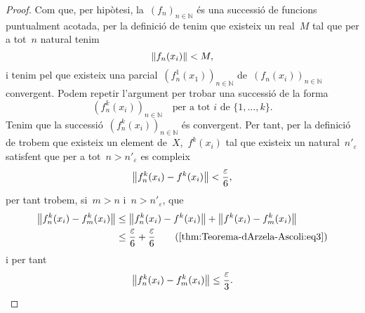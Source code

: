 \documentclass[../../main.tex]{subfiles}
\begin{document}
\begin{proof}
        Com que, per hipòtesi, la~\((f_{n})_{n\in\mathbb{N}}\) és una successió de funcions puntualment acotada, per la definició de  tenim que existeix un real~\(M\) tal que per a tot~\(n\) natural tenim
        \[
            \norm{f_{n}(x_{i})}<M,
        \]
        i tenim pel  que existeix una parcial~\((f_{n}^{1}(x_{1}))_{n\in\mathbb{N}}\) de~\((f_{n}(x_{i}))_{n\in\mathbb{N}}\) convergent.
        Podem repetir l'argument per trobar una successió de la forma
        \[
            (f^{k}_{n}(x_{i}))_{n\in\mathbb{N}}\quad\text{per a tot }i\text{ de }\{1,\dots,k\}.
        \]
        Tenim que la successió~\((f^{k}_{n}(x_{i}))_{n\in\mathbb{N}}\) és convergent.
        Per tant, per la definició de  trobem que existeix un element de~\(X\),~\(f^{k}(x_{i})\) tal que existeix un natural~\(n'_{\varepsilon}\) satisfent que per a tot~\(n>n'_{\varepsilon}\) es compleix
        \begin{equation}
            \label{thm:Teorema-dArzela-Ascoli:eq3}
            \norm{f^{k}_{n}(x_{i})-f^{k}(x_{i})}<\frac{\varepsilon}{6},
        \end{equation}
        per tant trobem, si~\(m>n\) i~\(n>n'_{\varepsilon}\), que
        \begin{align*}
            \norm{f^{k}_{n}(x_{i})-f^{k}_{m}(x_{i})}&\leq\norm{f^{k}_{n}(x_{i})-f^{k}(x_{i})}+\norm{f^{k}(x_{i})-f^{k}_{m}(x_{i})} \\
            &\leq\frac{\varepsilon}{6}+\frac{\varepsilon}{6} \tag{\ref{thm:Teorema-dArzela-Ascoli:eq3}}
        \end{align*}
        i per tant
        \begin{equation}
            \label{thm:Teorema-dArzela-Ascoli:eq4}
            \norm{f^{k}_{n}(x_{i})-f^{k}_{m}(x_{i})}\leq\frac{\varepsilon}{3}.
        \end{equation}


\end{proof}
\end{document}
